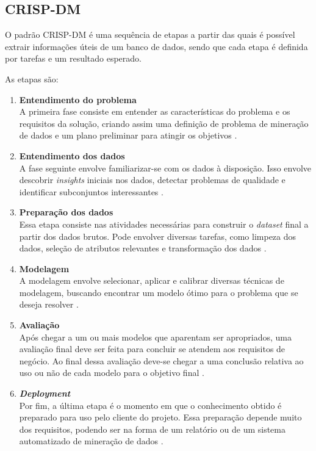 \subsection{CRISP-DM}

O padrão CRISP-DM é uma sequência de etapas a partir das quais é possível extrair informações úteis de um banco de dados, sendo que cada etapa é definida por tarefas e um resultado esperado.

As etapas são:

\begin{enumerate}
    \item \textbf{Entendimento do problema} \\
    A primeira fase consiste em entender as características do problema e os requisitos da solução, criando assim uma definição de problema de mineração de dados e um plano preliminar para atingir os objetivos \cite{crisp-dm}.
    \item \textbf{Entendimento dos dados} \\
    A fase seguinte envolve familiarizar-se com os dados à disposição. Isso envolve descobrir \textit{insights} iniciais nos dados, detectar problemas de qualidade e identificar subconjuntos interessantes \cite{crisp-dm}.
    \item \textbf{Preparação dos dados} \\
    Essa etapa consiste nas atividades necessárias para construir o \textit{dataset} final a partir dos dados brutos. Pode envolver diversas tarefas, como limpeza dos dados, seleção de atributos relevantes e transformação dos dados \cite{crisp-dm}.
    \item \textbf{Modelagem} \\
    A modelagem envolve selecionar, aplicar e calibrar diversas técnicas de modelagem, buscando encontrar um modelo ótimo para o problema que se deseja resolver \cite{crisp-dm}.
    \item \textbf{Avaliação} \\
    Após chegar a um ou mais modelos que aparentam ser apropriados, uma avaliação final deve ser feita para concluir se atendem aos requisitos de negócio. Ao final dessa avaliação deve-se chegar a uma conclusão relativa ao uso ou não de cada modelo para o objetivo final \cite{crisp-dm}.
    \item \textbf{\textit{Deployment}} \\
    Por fim, a última etapa é o momento em que o conhecimento obtido é preparado para uso pelo cliente do projeto. Essa preparação depende muito dos requisitos, podendo ser na forma de um relatório ou de um sistema automatizado de mineração de dados \cite{crisp-dm}.
\end{enumerate}

